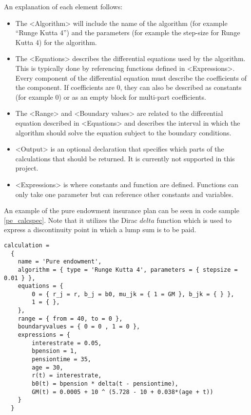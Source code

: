 An explanation of each element follows:
\begin{itemize}
\item The \textless Algorithm\textgreater{} will include the name of the algorithm (for example ``Runge Kutta 4'') and the parameters (for example the step-size for Runge Kutta 4) for the algorithm.
\item The \textless Equations\textgreater{}  describes the differential equations used by the algorithm. This is typically done by referencing functions defined in \textless{}Expressions\textgreater{}. Every component of the differential equation must describe the coefficients of the component. If coefficients are 0, they can also be described as constants (for example 0) or as an empty block for multi-part coefficients.
\item The \textless{}Range\textgreater{} and \textless{}Boundary values\textgreater{} are related to the differential equation described in \textless{}Equations\textgreater{} and describes the interval in which the algorithm should solve the equation subject to the boundary conditions.
\item \textless{}Output\textgreater{} is an optional declaration that specifies which parts of the calculations that should be returned. It is currently not supported in this project. %
\item \textless{}Expressions\textgreater{} is where constants and function are defined. Functions can only take one parameter but can reference other constants and variables.
\end{itemize}

An example of the pure endowment insurance plan can be seen in code sample \ref{pe_calcspec}. 
Note that it utilizes the Dirac $delta$ function\cite{hassani2009dirac} which is used to express a discontinuity point in which a lump sum is to be paid.%


\begin{lstlisting}[caption=The pure endowment insurance plan expressed in CalcSpec, label=pe_calcspec, language=calcspec]
calculation = 
  {
    name = 'Pure endowment',
    algorithm = { type = 'Runge Kutta 4', parameters = { stepsize = 0.01 } },
    equations = { 
        0 = { r_j = r, b_j = b0, mu_jk = { 1 = GM }, b_jk = { } },
        1 = { },
    },
    range = { from = 40, to = 0 },
    boundaryvalues = { 0 = 0 , 1 = 0 },
    expressions = {
        interestrate = 0.05,
        bpension = 1,
        pensiontime = 35,
        age = 30,
        r(t) = interestrate,
        b0(t) = bpension * delta(t - pensiontime),
        GM(t) = 0.0005 + 10 ^ (5.728 - 10 + 0.038*(age + t))
    }
  }
\end{lstlisting}

